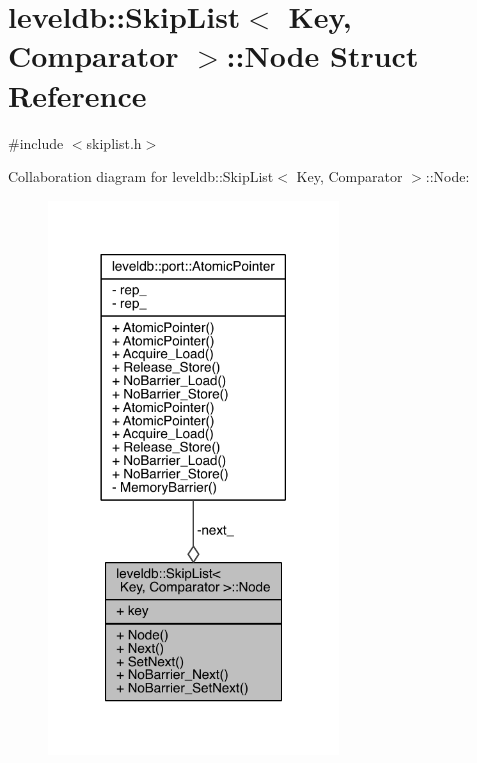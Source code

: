 \hypertarget{structleveldb_1_1_skip_list_1_1_node}{}\section{leveldb\+:\+:Skip\+List$<$ Key, Comparator $>$\+:\+:Node Struct Reference}
\label{structleveldb_1_1_skip_list_1_1_node}


{\ttfamily \#include $<$skiplist.\+h$>$}



Collaboration diagram for leveldb\+:\+:Skip\+List$<$ Key, Comparator $>$\+:\+:Node\+:\nopagebreak
\begin{figure}[H]
\begin{center}
\leavevmode
\includegraphics[width=218pt]{structleveldb_1_1_skip_list_1_1_node__coll__graph}
\end{center}
\end{figure}
